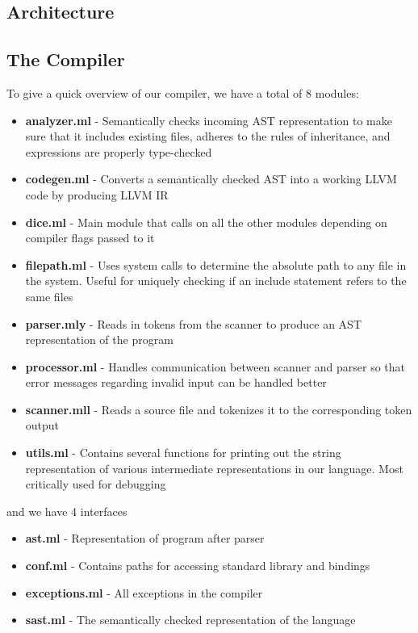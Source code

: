 \begin{homeworkProblem}
	\chapter{Architecture}
	\section{The Compiler}
	To give a quick overview of our compiler, we have a total of 8 modules:
	\begin{itemize}
		\item \textbf{analyzer.ml} - Semantically checks incoming AST representation to make sure that it includes existing files, adheres to the rules of inheritance, and expressions are properly type-checked
		\item \textbf{codegen.ml} - Converts a semantically checked AST into a working LLVM code by producing LLVM IR
		\item \textbf{dice.ml} - Main module that calls on all the other modules depending on compiler flags passed to it
		\item \textbf{filepath.ml} - Uses system calls to determine the absolute path to any file in the system. Useful for uniquely checking if an include statement refers to the same files
		\item \textbf{parser.mly} - Reads in tokens from the scanner to produce an AST representation of the program
		\item \textbf{processor.ml} - Handles communication between scanner and parser so that error messages regarding invalid input can be handled better
		\item \textbf{scanner.mll} - Reads a source file and tokenizes it to the corresponding token output
		\item \textbf{utils.ml} - Contains several functions for printing out the string representation of various intermediate representations in our language. Most critically used for debugging
	\end{itemize}
	
	and we have 4 interfaces
	\begin{itemize}
		\item \textbf{ast.ml} - Representation of program after parser
		\item \textbf{conf.ml} - Contains paths for accessing standard library and bindings
		\item \textbf{exceptions.ml} - All exceptions in the compiler
		\item \textbf{sast.ml} - The semantically checked representation of the language
	\end{itemize}
	

\end{homeworkProblem}
